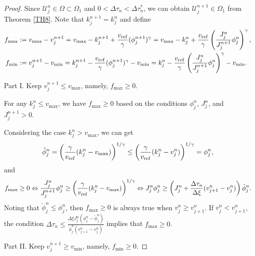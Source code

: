\documentclass[times,final,11pt]{elsarticle}
\numberwithin{equation}{section}
\theoremstyle{definition}
\theoremstyle{remark}
\begin{document}
\begin{proof}
	Since $\boldsymbol{\mathcal{U}}_j^{n} \in \Omega \subset \Omega_1$ and $0 < \Delta \tau_n < \Delta \tau_n^{*}$, we can obtain $\boldsymbol{\mathcal{U}}_j^{n + 1} \in \Omega_1$ from Theorem \ref{TH8}. 
	Note that $k_j^{n + 1} = k_j^{n}$ and define 
	\begin{equation*}
	\begin{aligned}
	f_{\max} &:= v_{\max} - v_j^{n + 1} = v_{\max} - k_j^{n + 1} + \frac{v_{\rm ref}}{\gamma} (\phi_j^{n + 1})^\gamma = v_{\max} - k_j^n + \frac{v_{\rm ref}}{\gamma} \left( \frac{J_j^n}{J_j^{n + 1}} \phi_j^n \right)^\gamma, \\
	f_{\min} &:= v_j^{n + 1} - v_{\min} = k_j^{n + 1} - \frac{v_{\rm ref}}{\gamma} (\phi_j^{n + 1})^\gamma - v_{\min} = k_j^n - \frac{v_{\rm ref}}{\gamma} \left( \frac{J_j^n}{J_j^{n + 1}} \phi_j^n \right)^\gamma - v_{\min}.
	\end{aligned}
	\end{equation*}
	
	{\sf Part I.} Keep $v_j^{n + 1} \leq v_{\max}$, namely, $f_{\max} \geq 0$.

	For any $k_j^n \leq v_{\max}$, we have $f_{\max} \geq 0$ based on the conditions $\phi_j^n$, $J_j^n$, and $J_j^{n + 1} > 0$.

	Considering the case $k_j^n > v_{\max}$, we can get 
	\begin{equation*}
	    \check{\phi}_j^n = \left(\frac{\gamma}{v_{\rm ref}} (k_j^n - v_{\max}) \right)^{1 / \gamma} \leq \left(\frac{\gamma}{v_{\rm ref}} (k_j^n - v_j^n)\right)^{1 / \gamma} = \phi_j^n,
	\end{equation*}
	and 
	\begin{equation*}
	    f_{\max} \geq 0 \Leftrightarrow \frac{J_j^n}{J_j^{n + 1}} \phi_j^n \geq \left(\frac{\gamma}{v_{\rm ref}} (k_j^n - v_{\max})\right)^{1 / \gamma} \Leftrightarrow J_j^n \phi_j^n \geq \left( J_j^n + \frac{\Delta \tau_n}{\Delta \xi} (v_{j + 1}^n - v_j^n) \right) \check{\phi}_j^n.
	\end{equation*}
	Noting that $\check{\phi}_j^n \leq \phi_j^n$, then $f_{\max} \geq 0$ is always true when $v_j^n \geq v_{j + 1}^n$. If $v_j^n < v_{j + 1}^n$, the condition $\Delta \tau_n \leq \frac{\Delta \xi J_j^n (\phi_j^n - \check{\phi}_j^n)}{\check{\phi}_j^n (v_{j + 1}^n - v_{j}^n)}$ implies that $f_{\max} \geq 0$.
	
	{\sf Part II.} Keep $v_j^{n + 1} \geq v_{\min}$, namely, $f_{\min} \geq 0$.


\end{proof}
\end{document}
